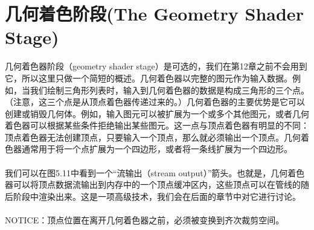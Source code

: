 \documentclass[11pt,a4paper,oldfontcommands]{memoir}
\begin{document}
{\section{几何着色阶段(The Geometry Shader Stage)}
\begin{flushleft}
几何着色器阶段（geometry shader stage）是可选的，我们在第12章之前不会用到它，所以这里只做一个简短的概述。几何着色器以完整的图元作为输入数据。例如，当我们绘制三角形列表时，输入到几何着色器的数据是构成三角形的三个点。（注意，这三个点是从顶点着色器传递过来的。）几何着色器的主要优势是它可以创建或销毁几何体。例如，输入图元可以被扩展为一个或多个其他图元，或者几何着色器可以根据某些条件拒绝输出某些图元。这一点与顶点着色器有明显的不同：顶点着色器无法创建顶点，只要输入一个顶点，那么就必须输出一个顶点。几何着色器通常用于将一个点扩展为一个四边形，或者将一条线扩展为一个四边形。\\
~\\
我们可以在图5.11中看到一个“流输出（stream output）”箭头。也就是，几何着色器可以将顶点数据流输出到内存中的一个顶点缓冲区内，这些顶点可以在管线的随后阶段中渲染出来。这是一项高级技术，我们会在后面的章节中对它进行讨论。\\
~\\
NOTICE：顶点位置在离开几何着色器之前，必须被变换到齐次裁剪空间。
\end{flushleft}

}
\end{document}
